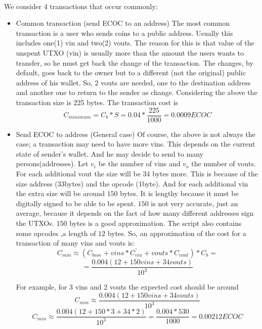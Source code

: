 \documentclass{article}
\begin{document}
\paragraph{}
We consider 4 transactions that occur commonly:
\begin{itemize}
\item Common transaction (send ECOC to an address)
The most common transaction is a user who sends coins to a public address. Usually this includes one(1) vin and two(2) vouts. The reason for this is that value of the unspent UTXO (vin) is usually more than the amount the users wants to transfer, so he must get back the change of the transaction. The changes, by default, goes back to the owner but to a different (not the original) public address of his wallet. So, 2 vouts are needed, one to the destination address and another one to return to the sender as change. Considering the above the transaction size is $225$ bytes. The transaction cost is
$$C_{minimum} = C_{b}*S=0.04*\frac{225}{1000}=0.0009 ECOC$$
\item Send ECOC to address (General case)
Of course, the above is not always the case; a transaction may need to have more vins. This depends on the current state of sender's wallet. And he may decide to send to many persons(addresses). Let $v_{i}$ be the number of vins and  $v_{o}$ the number of vouts. For each additional vout the size will be 34 bytes more. This is because of the size address (33bytes) and the opcode (1byte). And for each additional vin the extra size will be around $150$ bytes. It is lengthy because it must be digitally signed to be able to be spent. $150$ is not very accurate, just an average, because it depends on the fact of how many different addresses sign the UTXOs. $150$ bytes is a good approximation. The script also contains some opcodes ,a length of $12$ bytes. So, an approximation of the cost for a transaction of many vins and vouts is:
$$C_{min} \approx (C_{base}+vins*\bar{C_{vin}}+vouts*C_{vout})*C_{b}=$$ 
$$=\frac{0.004(12+150vins+34vouts)}{10^3}$$

For example, for 3 vins and 2 vouts the expected cost should be around
$$C_{min} \approx \frac{0.004(12+150vins+34vouts)}{10^3} $$
$$C_{min} \approx \frac{0.004(12+150*3+34*2)}{10^3} =\frac{0.004*530}{1000}=0.00212 ECOC$$


\end{itemize}
\end{document}
